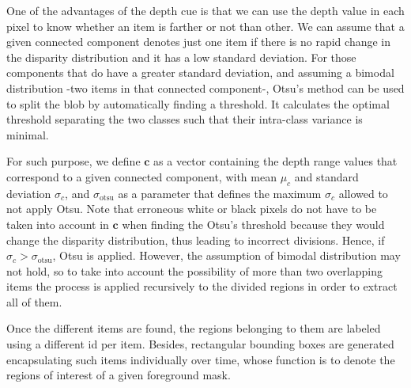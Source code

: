 \documentclass[10pt,twocolumn,letterpaper]{article}
\begin{document}
One of the advantages of the depth cue is that we can use the depth value in each pixel to know whether an item is farther or not than other. We can assume that a given connected component denotes just one item if there is no rapid change in the disparity distribution and it has a low standard deviation. For those components that do have a greater standard deviation, and assuming a bimodal distribution -two items in that connected component-, Otsu's method \cite{otsu1975threshold} can be used to split the blob by automatically finding a threshold. It calculates the optimal threshold separating the two classes such that their intra-class variance is minimal. 


For such purpose, we define $\mathbf{c}$ as a vector containing the depth range values that correspond to a given connected component, with mean $\mu_{c}$ and standard deviation $\sigma_{c}$, and $\sigma_\mathrm{otsu}$ as a parameter that defines the maximum $\sigma_{c}$ allowed to not apply Otsu. Note that erroneous white or black pixels do not have to be taken into account in $\mathbf{c}$ when finding the Otsu's threshold because they would change the disparity distribution, thus leading to incorrect divisions. Hence, if $\sigma_{c} > \sigma_\mathrm{otsu}$, Otsu is applied. However, the assumption of bimodal distribution may not hold, so to take into account the possibility of more than two overlapping items the process is applied recursively to the divided regions in order to extract all of them. 

Once the different items are found, the regions belonging to them are labeled using a different id per item. Besides, rectangular bounding boxes are generated encapsulating such items individually over time, whose function is to denote the regions of interest of a given foreground mask. 

\end{document}
